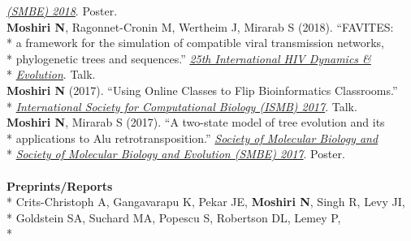 \documentclass[margin,line]{res}
\begin{document}
\begin{resume}
\hspace*{8mm} \href{https://smbe.org/smbe/SMBE2018Meeting/}{\textit{(SMBE) 2018}}. Poster.\\
\hspace*{4mm} \textbf{Moshiri N}, Ragonnet-Cronin M, Wertheim J, Mirarab S (2018). ``FAVITES:\\*
\hspace*{9mm} a framework for the simulation of compatible viral transmission networks,\\*
\hspace*{9mm} phylogenetic trees and sequences.'' \href{https://cme.ucsd.edu/hivdynamics/}{\textit{25th International HIV Dynamics \&}}\\*\vspace{2mm}
\hspace*{8mm} \href{https://cme.ucsd.edu/hivdynamics/}{\textit{Evolution}}. Talk.\\
\hspace*{4mm} \textbf{Moshiri N} (2017). ``Using Online Classes to Flip Bioinformatics Classrooms.''\\*\vspace{2mm}
\hspace*{8mm} \href{https://www.iscb.org/cms_addon/conferences/ismbeccb2017/technologytrack.php}{\textit{International Society for Computational Biology (ISMB) 2017}}. Talk.\\
\hspace*{4mm} \textbf{Moshiri N}, Mirarab S (2017). ``A two-state model of tree evolution and its\\*
\hspace*{9mm} applications to Alu retrotransposition.'' \href{https://smbe.org/smbe/}{\textit{Society of Molecular Biology and}}\\*\vspace{2mm}
\hspace*{8mm} \href{https://smbe.org/smbe/}{\textit{Society of Molecular Biology and Evolution (SMBE) 2017}}. Poster.\\
~\\
\textbf{Preprints/Reports}\vspace{2mm}\\*
\hspace*{4mm} Crits-Christoph A, Gangavarapu K, Pekar JE, \textbf{Moshiri N}, Singh R, Levy JI,\\*
\hspace*{9mm} Goldstein SA, Suchard MA, Popescu S, Robertson DL, Lemey P,\\*

\end{resume}
\end{document}
